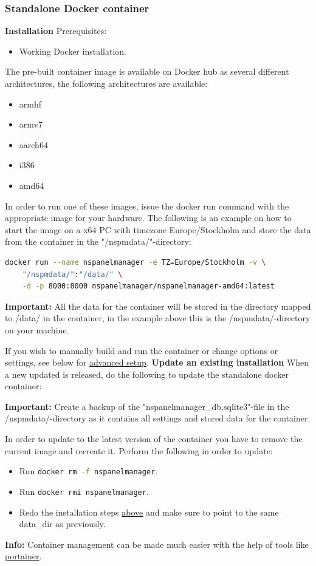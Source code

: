 \documentclass[10pt]{article}
\newcommand{\info}[1]{\begin{infoBox} \textbf{Info:} #1 \end{infoBox}}
\newcommand{\important}[1]{\begin{importantBox} \textbf{Important:} #1 \end{importantBox}}
\begin{document}
    \subsubsection{Standalone Docker container}
    \label{sec:standalone_docker_container}
    \textbf{Installation}\newline
    Prerequisites:
    \begin{itemize}
      \item Working Docker installation.
    \end{itemize}
    The pre-built container image is available on Docker hub as several different architectures, the following architectures are available:
    \begin{itemize}
      \item armhf
      \item armv7
      \item aarch64
      \item i386
      \item amd64
    \end{itemize}
    In order to run one of these images, issue the docker run command with the appropriate image for your hardware. The following is an example on how to start the image on a x64 PC with timezone Europe/Stockholm and store the data from the container in the "/nspmdata/"-directory:
    \begin{lstlisting}[language=bash]
    docker run --name nspanelmanager -e TZ=Europe/Stockholm -v \
    "/nspmdata/":"/data/" \
    -d -p 8000:8000 nspanelmanager/nspanelmanager-amd64:latest
    \end{lstlisting}
    \important{All the data for the container will be stored in the directory mapped to /data/ in the container, in the example above this is the /nspmdata/-directory on your machine.}
    If you wish to manually build and run the container or change options or settings, see below for \hyperref[sec:advanced_setup]{advanced setup}.
    \bigbreak
    \textbf{Update an existing installation}\newline
    When a new updated is released, do the following to update the standalone docker container:
    \important{Create a backup of the "nspanelmanager\_db.sqlite3"-file in the /nspmdata/-directory as it contains all settings and stored data for the container.}
    In order to update to the latest version of the container you have to remove the current image and recreate it. Perform the following in order to update:
    \begin{itemize}
      \item Run \lstinline[language=bash]{docker rm -f nspanelmanager}.
      \item Run \lstinline[language=bash]{docker rmi nspanelmanager}.
      \item Redo the installation steps \hyperref[sec:standalone_docker_container]{above} and make sure to point to the same data\_dir as previously.
    \end{itemize}
    \info{Container management can be made much easier with the help of tools like \href{https://www.portainer.io/}{portainer}.}
\end{document}
